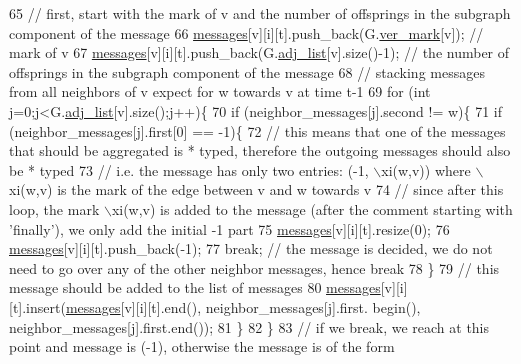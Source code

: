 \begin{DoxyCode}
65           \textcolor{comment}{// first, start with the mark of v and the number of offsprings in the subgraph component of the
       message}
66           \hyperlink{classgraph__message_a06a1d1ab91b4891c65ea80205566f800}{messages}[v][i][t].push\_back(G.\hyperlink{classmarked__graph_ac83e9377dd4d8bb95be1ac949b127296}{ver\_mark}[v]); \textcolor{comment}{// mark of v}
67           \hyperlink{classgraph__message_a06a1d1ab91b4891c65ea80205566f800}{messages}[v][i][t].push\_back(G.\hyperlink{classmarked__graph_a1a0bf7ca413a278763f7c878b3b6fd6f}{adj\_list}[v].size()-1); \textcolor{comment}{// the number of offsprings
       in the subgraph component of the message}
68           \textcolor{comment}{// stacking messages from all neighbors of v expect for w towards v at time t-1}
69           \textcolor{keywordflow}{for} (\textcolor{keywordtype}{int} j=0;j<G.\hyperlink{classmarked__graph_a1a0bf7ca413a278763f7c878b3b6fd6f}{adj\_list}[v].size();j++)\{
70             \textcolor{keywordflow}{if} (neighbor\_messages[j].second != w)\{
71               \textcolor{keywordflow}{if} (neighbor\_messages[j].first[0] == -1)\{
72                 \textcolor{comment}{// this means that one of the messages that should be aggregated is * typed, therefore the
       outgoing messages should also be * typed}
73                 \textcolor{comment}{// i.e. the message has only two entries: (-1, \(\backslash\)xi(w,v)) where \(\backslash\)xi(w,v) is the mark of the
       edge between v and w towards v}
74                 \textcolor{comment}{// since after this loop, the mark \(\backslash\)xi(w,v) is added to the message (after the comment
       starting with 'finally'), we only add the initial -1 part}
75                 \hyperlink{classgraph__message_a06a1d1ab91b4891c65ea80205566f800}{messages}[v][i][t].resize(0);
76                 \hyperlink{classgraph__message_a06a1d1ab91b4891c65ea80205566f800}{messages}[v][i][t].push\_back(-1);
77                 \textcolor{keywordflow}{break}; \textcolor{comment}{// the message is decided, we do not need to go over any of the other neighbor
       messages, hence break}
78               \}
79               \textcolor{comment}{// this message should be added to the list of messages}
80               \hyperlink{classgraph__message_a06a1d1ab91b4891c65ea80205566f800}{messages}[v][i][t].insert(\hyperlink{classgraph__message_a06a1d1ab91b4891c65ea80205566f800}{messages}[v][i][t].end(), neighbor\_messages[j].first.
      begin(), neighbor\_messages[j].first.end());
81             \}
82           \}
83           \textcolor{comment}{// if we break, we reach at this point and message is (-1), otherwise the message is of the form
}
\end{DoxyCode}

